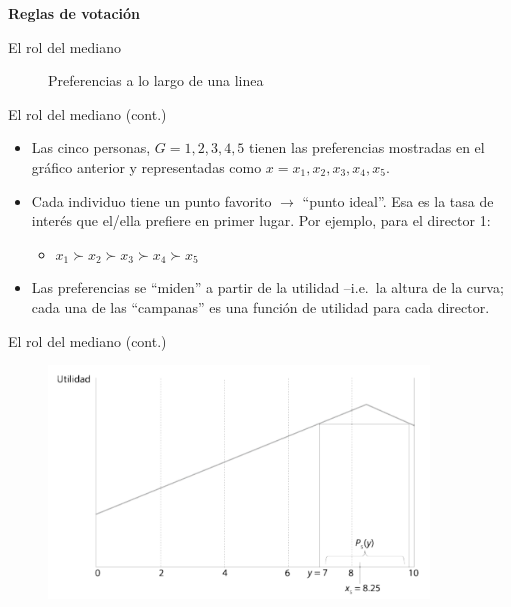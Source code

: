 \documentclass[
  ignorenonframetext,
]{beamer}
\providecommand{\tightlist}{%
  \setlength{\itemsep}{0pt}\setlength{\parskip}{0pt}}\usepackage{longtable,booktabs,array}
\begin{document}
\begin{frame}{\textbf{Reglas de votación}}
\begin{block}{El rol del mediano}
\begin{figure}
{}

\caption{Preferencias a lo largo de una linea}

\end{figure}
\end{block}

\begin{block}{El rol del mediano (cont.)}
\protect\hypertarget{el-rol-del-mediano-cont.}{}
\begin{itemize}
\tightlist
\item
  Las cinco personas, \(G={1,2,3,4,5}\) tienen las preferencias
  mostradas en el gráfico anterior y representadas como
  \(x={x_1,x_2,x_3,x_4,x_5}\).
\item
  Cada individuo tiene un punto favorito \(\longrightarrow\) ``punto
  ideal''. Esa es la tasa de interés que el/ella prefiere en primer
  lugar. Por ejemplo, para el director 1:

  \begin{itemize}
  \tightlist
  \item
    \(x_1 \succ x_2 \succ x_3 \succ x_4 \succ x_5\)
  \end{itemize}
\item
  Las preferencias se ``miden'' a partir de la utilidad --i.e.~la altura
  de la curva; cada una de las ``campanas'' es una función de utilidad
  para cada director.
\end{itemize}
\end{block}

\begin{block}{El rol del mediano (cont.)}
\protect\hypertarget{el-rol-del-mediano-cont.-1}{}
\begin{figure}

{\centering \includegraphics[width=0.9\textwidth,height=\textheight]{../epol/fig/fig-02-007.png}

}


\end{figure}
\end{block}
\end{frame}
\end{document}
